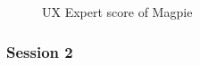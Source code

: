 \begin{figure}
  \centering
  \caption{UX Expert score of Magpie}
\end{figure}

\subsubsection{Session 2}